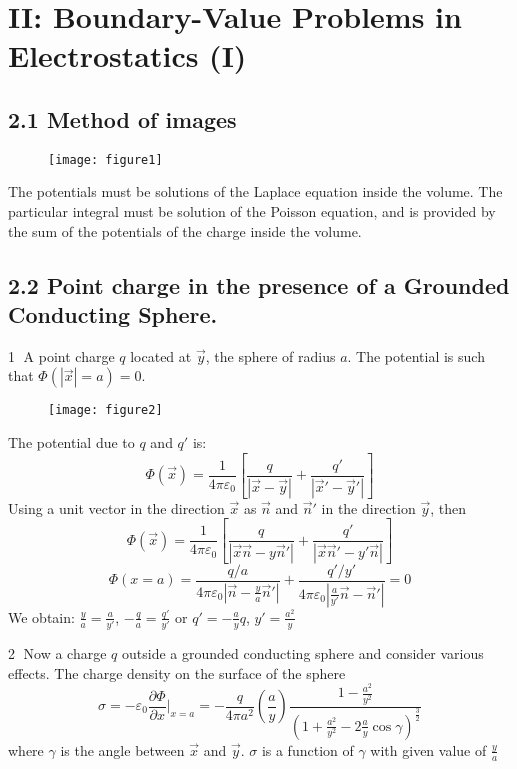 \documentclass{article}
\begin{document}
	
	\section*{II: Boundary-Value Problems in Electrostatics (I)}
	
	\subsection*{2.1 Method of images}

    \begin{figure}[h]
	    \centering
	    \texttt{[image: figure1]}
	    \caption{}
    	\label{fig:figure1}
    \end{figure}
	
	The potentials must be solutions of the Laplace equation inside the volume. The particular integral must be solution of the Poisson equation, and is provided by the sum of the potentials of the charge inside the volume.
	
	\subsection*{2.2 Point charge in the presence of a Grounded Conducting Sphere.}

	\textcircled{1} A point charge $q$ located at $\vec{y}$, the sphere of radius $a$. The potential is such that $\Phi(|\vec{x}|=a) = 0$.
	
	\begin{figure}[h]
		\centering
		\texttt{[image: figure2]}
		\caption{}
		\label{fig:figure2}
	\end{figure}
	
	The potential due to $q$ and $q'$ is:
	$$ \Phi(\vec{x}) = \frac{1}{4\pi\varepsilon_0} \left[ \frac{q}{|\vec{x}-\vec{y}|} + \frac{q'}{|\vec{x}'-\vec{y}'|} \right] $$
	Using a unit vector in the direction $\vec{x}$ as $\vec{n}$ and $\vec{n}'$ in the direction $\vec{y}$, then
	$$ \Phi(\vec{x}) = \frac{1}{4\pi\varepsilon_0} \left[ \frac{q}{|\vec{x}\vec{n} - y\vec{n}'|} + \frac{q'}{|\vec{x}\vec{n}' - y'\vec{n}|} \right] $$
	$$ \Phi(x=a) = \frac{q/a}{4\pi\varepsilon_0|\vec{n} - \frac{y}{a}\vec{n}'|} + \frac{q'/y'}{4\pi\varepsilon_0|\frac{a}{y'}\vec{n} - \vec{n}'|} = 0 $$
	We obtain: $\frac{y}{a} = \frac{a}{y'}$, $-\frac{q}{a} = \frac{q'}{y'}$
	or $q' = -\frac{a}{y}q$, $y' = \frac{a^2}{y}$
	
	\textcircled{2} Now a charge $q$ outside a grounded conducting sphere and consider various effects. The charge density on the surface of the sphere
	$$ \sigma = -\varepsilon_0 \frac{\partial\Phi}{\partial x}|_{x=a} = -\frac{q}{4\pi a^2} \left(\frac{a}{y}\right) \frac{1 - \frac{a^2}{y^2}}{\left(1 + \frac{a^2}{y^2} - 2\frac{a}{y}\cos\gamma\right)^{\frac{3}{2}}} $$
	where $\gamma$ is the angle between $\vec{x}$ and $\vec{y}$.
	$\sigma$ is a function of $\gamma$ with given value of $\frac{y}{a}$
	
\end{document}
